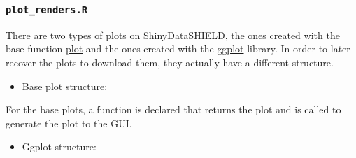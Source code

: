 \documentclass[
]{book}
\newenvironment{Shaded}{\begin{snugshade}}{\end{snugshade}}
\newcommand{\ControlFlowTok}[1]{\textcolor[rgb]{0.13,0.29,0.53}{\textbf{#1}}}
\newcommand{\FunctionTok}[1]{\textcolor[rgb]{0.00,0.00,0.00}{#1}}
\newcommand{\NormalTok}[1]{#1}
\newcommand{\OtherTok}[1]{\textcolor[rgb]{0.56,0.35,0.01}{#1}}
\newcommand{\SpecialCharTok}[1]{\textcolor[rgb]{0.00,0.00,0.00}{#1}}
\providecommand{\tightlist}{%
  \setlength{\itemsep}{0pt}\setlength{\parskip}{0pt}}
\begin{document}
\hypertarget{plot_renders.r}{%
\subsubsection{\texorpdfstring{\texttt{plot\_renders.R}}{plot\_renders.R}}\label{plot_renders.r}}

There are two types of plots on ShinyDataSHIELD, the ones created with the base function \href{https://www.rdocumentation.org/packages/graphics/versions/3.6.2/topics/plot}{plot} and the ones created with the \href{https://ggplot2.tidyverse.org/}{ggplot} library. In order to later recover the plots to download them, they actually have a different structure.

\begin{itemize}
\tightlist
\item
  Base plot structure:
\end{itemize}

\begin{Shaded}
\end{Shaded}

For the base plots, a function is declared that returns the plot and is called to generate the plot to the GUI.

\begin{itemize}
\tightlist
\item
  Ggplot structure:
\end{itemize}

\begin{Shaded}
\end{Shaded}
\end{document}
